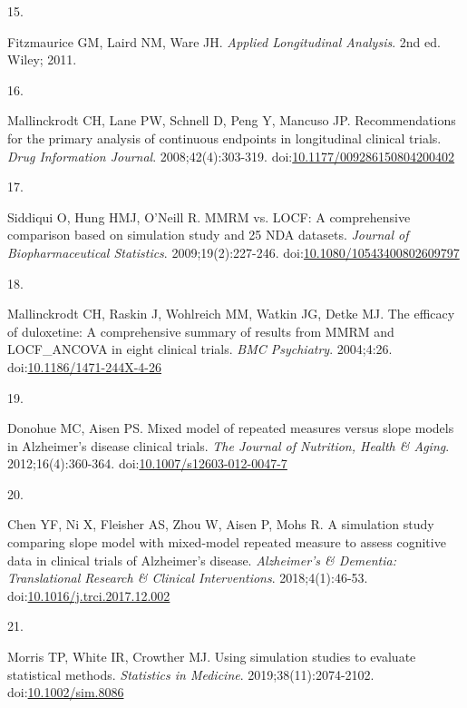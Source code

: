 \documentclass[
  11pt,
]{article}
\newlength{\cslhangindent}
\newlength{\csllabelwidth}
\newenvironment{CSLReferences}[2] %
 {\begin{list}{}{%
  \setlength{\itemindent}{0pt}
  \setlength{\leftmargin}{0pt}
  \setlength{\parsep}{0pt}
  \ifodd #1
   \setlength{\leftmargin}{\cslhangindent}
   \setlength{\itemindent}{-1\cslhangindent}
  \fi
  \setlength{\itemsep}{#2\baselineskip}}}
 {\end{list}}
\newcommand{\CSLLeftMargin}[1]{\parbox[t]{\csllabelwidth}{\strut#1\strut}}
\newcommand{\CSLRightInline}[1]{\parbox[t]{\linewidth - \csllabelwidth}{\strut#1\strut}}
\begin{document}
\begin{CSLReferences}{0}{1}
\CSLLeftMargin{15. }%
\CSLRightInline{Fitzmaurice GM, Laird NM, Ware JH. \emph{Applied Longitudinal Analysis}. 2nd ed. Wiley; 2011.}

\CSLLeftMargin{16. }%
\CSLRightInline{Mallinckrodt CH, Lane PW, Schnell D, Peng Y, Mancuso JP. Recommendations for the primary analysis of continuous endpoints in longitudinal clinical trials. \emph{Drug Information Journal}. 2008;42(4):303-319. doi:\href{https://doi.org/10.1177/009286150804200402}{10.1177/009286150804200402}}

\CSLLeftMargin{17. }%
\CSLRightInline{Siddiqui O, Hung HMJ, O'Neill R. {MMRM} vs. {LOCF}: A comprehensive comparison based on simulation study and 25 {NDA} datasets. \emph{Journal of Biopharmaceutical Statistics}. 2009;19(2):227-246. doi:\href{https://doi.org/10.1080/10543400802609797}{10.1080/10543400802609797}}

\CSLLeftMargin{18. }%
\CSLRightInline{Mallinckrodt CH, Raskin J, Wohlreich MM, Watkin JG, Detke MJ. The efficacy of duloxetine: A comprehensive summary of results from {MMRM} and {LOCF\_ANCOVA} in eight clinical trials. \emph{BMC Psychiatry}. 2004;4:26. doi:\href{https://doi.org/10.1186/1471-244X-4-26}{10.1186/1471-244X-4-26}}

\CSLLeftMargin{19. }%
\CSLRightInline{Donohue MC, Aisen PS. Mixed model of repeated measures versus slope models in {Alzheimer's} disease clinical trials. \emph{The Journal of Nutrition, Health \& Aging}. 2012;16(4):360-364. doi:\href{https://doi.org/10.1007/s12603-012-0047-7}{10.1007/s12603-012-0047-7}}

\CSLLeftMargin{20. }%
\CSLRightInline{Chen YF, Ni X, Fleisher AS, Zhou W, Aisen P, Mohs R. A simulation study comparing slope model with mixed-model repeated measure to assess cognitive data in clinical trials of {Alzheimer's} disease. \emph{Alzheimer's \& Dementia: Translational Research \& Clinical Interventions}. 2018;4(1):46-53. doi:\href{https://doi.org/10.1016/j.trci.2017.12.002}{10.1016/j.trci.2017.12.002}}

\CSLLeftMargin{21. }%
\CSLRightInline{Morris TP, White IR, Crowther MJ. Using simulation studies to evaluate statistical methods. \emph{Statistics in Medicine}. 2019;38(11):2074-2102. doi:\href{https://doi.org/10.1002/sim.8086}{10.1002/sim.8086}}


\end{CSLReferences}
\end{document}
